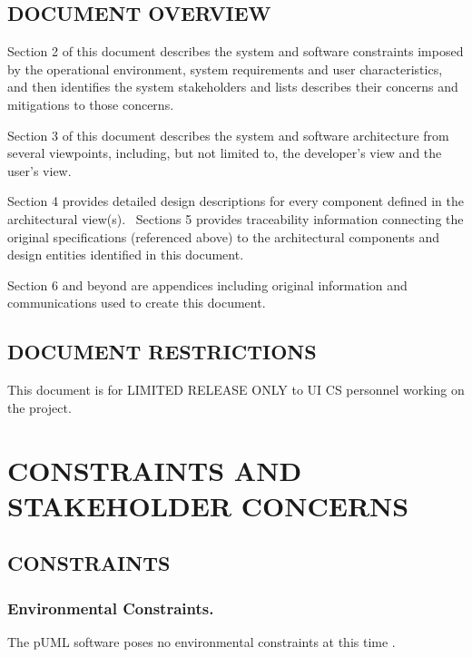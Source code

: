 \documentclass[twoside,letterpaper]{article}
\begin{document}
{\clearpage
\subsection{DOCUMENT OVERVIEW}

{\color{black}
Section 2 of this document describes the system and software constraints
imposed by the operational environment, system requirements and user
characteristics, and then identifies the system stakeholders and lists
describes their concerns and mitigations to those concerns.}

{\color{black}
Section 3 of this document describes the system and software
architecture from several viewpoints, including, but not limited to,
the developer{\textquoteright}s view and the user{\textquoteright}s
view.}

{\color{black}
Section 4 provides detailed design descriptions for every component
defined in the architectural view(s). \ Sections 5 provides
traceability information connecting the original specifications
(referenced above) to the architectural components and design entities
identified in this document.}

{\color{black}
Section 6 and beyond are appendices including original information and
communications used to create this document.}

\subsection[DOCUMENT
RESTRICTIONS]{\bfseries\color{black} DOCUMENT
RESTRICTIONS}

{\color{black}
This document is for LIMITED RELEASE ONLY to UI CS personnel working on
the project.}

\clearpage
\section{CONSTRAINTS AND STAKEHOLDER CONCERNS}

\subsection{CONSTRAINTS}

\subsubsection{Environmental Constraints.}
{\color{black}
The pUML software poses no environmental constraints at this time .
}

}
\end{document}
